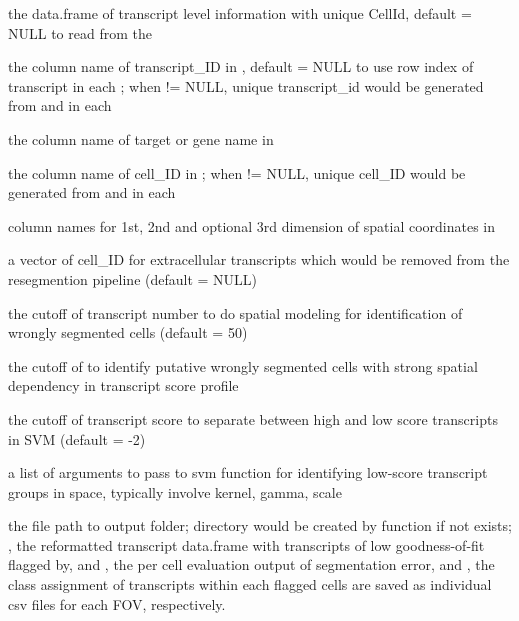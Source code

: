 \documentclass[letterpaper]{book}
\begin{document}
\begin{Arguments}
\begin{ldescription}
\item[\code{transcript\_df}] the data.frame of transcript level information with unique CellId, default = NULL to read from the 

\item[\code{transID\_coln}] the column name of transcript\_ID in , default = NULL to use row index of transcript in each ; when  != NULL, unique transcript\_id would be generated from  and  in each 

\item[\code{transGene\_coln}] the column name of target or gene name in 

\item[\code{cellID\_coln}] the column name of cell\_ID in ; when  != NULL, unique cell\_ID would be generated from  and  in each 

\item[\code{spatLocs\_colns}] column names for 1st, 2nd and optional 3rd dimension of spatial coordinates in 

\item[\code{extracellular\_cellID}] a vector of cell\_ID for extracellular transcripts which would be removed from the resegmention pipeline (default = NULL)

\item[\code{flagModel\_TransNum\_cutoff}] the cutoff of transcript number to do spatial modeling for identification of wrongly segmented cells (default = 50)

\item[\code{flagCell\_lrtest\_cutoff}] the cutoff of  to identify putative wrongly segmented cells with strong spatial dependency in transcript score profile

\item[\code{svmClass\_score\_cutoff}] the cutoff of transcript score to separate between high and low score transcripts in SVM (default = -2)

\item[\code{svm\_args}] a list of arguments to pass to svm function for identifying low-score transcript groups in space, typically involve kernel, gamma, scale

\item[\code{path\_to\_output}] the file path to output folder; directory would be created by function if not exists; , the reformatted transcript data.frame with transcripts of low goodness-of-fit flagged by, and , the per cell evaluation output of segmentation error, and , the class assignment of transcripts within each flagged cells are saved as individual csv files for each FOV, respectively.


\end{ldescription}
\end{Arguments}
\end{document}
